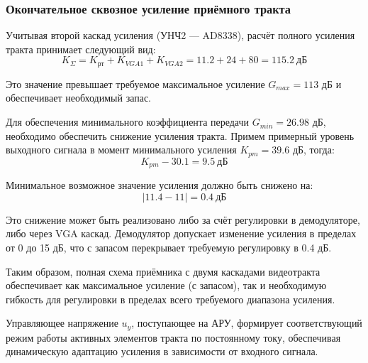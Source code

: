 \documentclass[a4paper,12pt]{article}
\begin{document}
\subsubsection{Окончательное сквозное усиление приёмного тракта}

Учитывая второй каскад усиления (УНЧ2 — AD8338), расчёт полного усиления тракта принимает следующий вид:
\begin{equation}
K_\Sigma = K_{рт} + K_{VGA1} + K_{VGA2} = 11.2 + 24 + 80 = 115.2\ \text{дБ}
\end{equation}

Это значение превышает требуемое максимальное усиление $G_{max} = 113$ дБ и обеспечивает необходимый запас.

Для обеспечения минимального коэффициента передачи $G_{min} = 26.98$ дБ, необходимо обеспечить снижение усиления тракта. Примем примерный уровень выходного сигнала в момент минимального усиления $K_{pm} = 39.6$ дБ, тогда:
\begin{equation}
K_{pm} - 30.1 = 9.5\ \text{дБ}
\end{equation}

Минимальное возможное значение усиления должно быть снижено на:
\begin{equation}
|11.4 - 11| = 0.4\ \text{дБ}
\end{equation}

Это снижение может быть реализовано либо за счёт регулировки в демодуляторе, либо через VGA каскад. Демодулятор допускает изменение усиления в пределах от 0 до 15 дБ, что с запасом перекрывает требуемую регулировку в 0.4 дБ.

Таким образом, полная схема приёмника с двумя каскадами видеотракта обеспечивает как максимальное усиление (с запасом), так и необходимую гибкость для регулировки в пределах всего требуемого диапазона усиления.

Управляющее напряжение $u_y$, поступающее на АРУ, формирует соответствующий режим работы активных элементов тракта по постоянному току, обеспечивая динамическую адаптацию усиления в зависимости от входного сигнала.




\newpage
\end{document}
